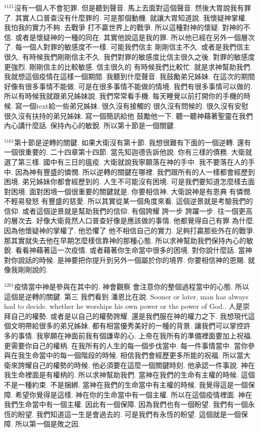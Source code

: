 \documentclass{book}
\begin{document}
$^{1121}$沒有一個人不會犯罪.
但是聽到聲音.
馬上去面對這個聲音.
然後大胃說我有罪了.
其實人口普查沒有什麼罪的.
可是那個動機.
就讓大胃知道說.
我懷疑神掌權.
我怕我的實力不夠.
去戰爭 打不贏世界上的戰爭.
所以這種對神的懷疑.
對神的不信.
或者是懷疑神的一種的同在.
其實他說這是我的罪.
所以他已經在另外一個層次了.
每一個人對罪的敏感度不一樣.
可能我們信主 剛剛信主不久.
或者是我們信主很久.
有時候我們剛剛信主不久.
我們對罪的敏感度比信主很久之後.
對罪的敏感度更強烈.
剛剛信主的比較敏感.
信主很久的 有時候我們比較忙.
就是求神幫助我們.
我就想這個疫情在這樣一個期間.
我聽到什麼聲音.
我鼓勵弟兄姊妹.
在這次的期間好像有很多事情不能做.
可是在很多事情不能做的情境.
我們有很多事情可以做的.
所以有時候我就跟弟兄姊妹說.
我們常常看手機.
每天睡覺以前打開你的手機的時候.
寫一個text給一些弟兄姊妹.
很久沒有接觸的 很久沒有問候的.
很久沒有安慰 很久沒有扶持的弟兄姊妹.
寫一個簡訊給他 鼓勵他一下.
聽一聽神藉著聖靈在我們內心講什麼話.
保持內心的敏銳.
所以第十節是一個關鍵.

$^{1161}$第十節是逆轉的關鍵.
如果大衛沒有第十節.
我想很難有下面的一個逆轉.
還有一個很重要的.
二十四章第十四節.
當先知迦德告訴他說.
你有三樣的債務.
大衛就選了第三樣.
國中有三日的瘟疫.
大衛就說我寧願落在神的手中.
我不要落在人的手中.
因為神有豐盛的憐憫.
所以逆轉的關鍵在哪裡.
我們跟所有的人一樣都會經歷到困境.
弟兄姊妹你都會經歷到的.
人生不可能沒有困境.
可是我們要知道怎麼樣去面對困境.
面對困境一個很重要的關鍵就是.
你要相信神.
大衛說神是有恩典 有憐憫.
不輕易發怒 有豐盛的慈愛.
所以其實從某一個角度來看.
這個逆景就是考驗我們的信仰.
或者這個逆景就是幫助我們的信仰.
有個誇耀 誇一步 誇躍一步.
往一個更高的層次去.
好像大衛竟然人口普查好像是應該做的事情.
他都覺得自己有罪 為什麼.
因為他懷疑神的掌權了.
他恐懼了 他不相信自己的實力.
足夠打贏那些外在的戰爭.
那其實就失去他在早期怎麼樣信靠神的那種心態.
所以求神幫助我們保持內心的敏銳.
看看神藉著這一次疫情.
或者藉著你生命當中很多的困境.
對你說什麼話.
當神對你說話的時候.
是神要把你提升到另外一個屬於你的境界.
你要相信神的恩賜.
就像我剛剛說的.

$^{1201}$疫情當中神是參與在其中的.
神會觀察 會注意你的整個過程當中的心態.
所以這個是逆轉的關鍵.
第三 我們看到 潘恩比在說.
Sooner or later, man has always had to decide.
whether he worships his own power or the power of God..
人是崇拜自己的權勢.
或者是以自己的權勢誇耀.
還是我們服在神的權力之下.
我想現代這個文明帶給很多的弟兄姊妹.
都有相當優秀美好的一種的背景.
讓我們可以掌控許多的事情.
我寧願在神面前我有個謙卑的心.
上帝在我所有的準備裡面要加上祝福.
更需要你自己的權柄.
在我所有的人生的每一個步伐當中.
每一件事情當中.
當你參與在我生命當中的每一個階段的時候.
相信我們會經歷更多所能的祝福.
所以當大衛來誇耀自己的權勢的時候.
他必須要在這麼一個關鍵時刻.
他承認一件事說.
神在我生命裡面是有權柄的.
所以求神幫助我們.
當神在我們的生命有主權的時候.
這個不是一種約束.
不是捆綁.
當神在我們的生命當中有主權的時候.
我覺得這是一個保障.
希望你覺得是這樣.
神在你的生命當中有一個主權.
所以在這個疫情裡面.
神在我們生命當中有一個主權.
因此有一個保障.
因為我們也有一個盼望.
我們有一個永恆的盼望.
我們知道這一生是會過去的.
可是我們有永恆的盼望.
這個就是一個保障.
所以第一個是敗之因.
\end{document}
